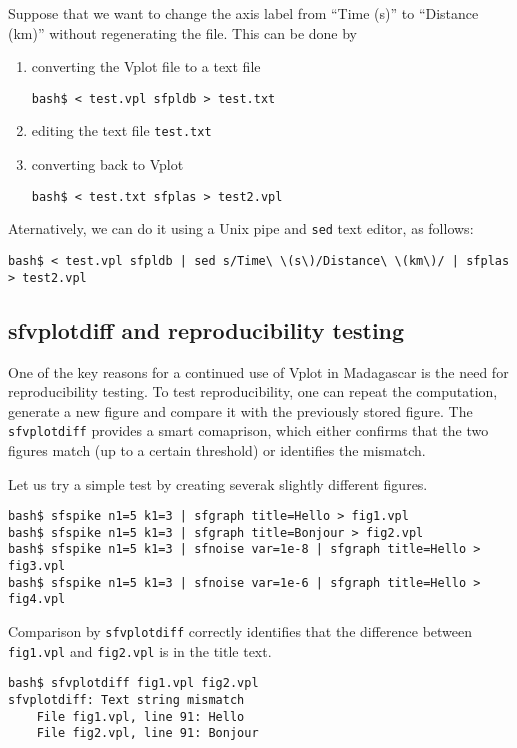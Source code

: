 Suppose that we want to change the axis label from ``Time (s)'' to ``Distance (km)'' without regenerating the file. This can be done by
\begin{enumerate}
\item converting the Vplot file to a text file
\begin{verbatim}
bash$ < test.vpl sfpldb > test.txt
\end{verbatim}
\item editing the text file \texttt{test.txt}
\item converting back to Vplot
\begin{verbatim}
bash$ < test.txt sfplas > test2.vpl
\end{verbatim}
\end{enumerate}

Aternatively, we can do it using a Unix pipe and \texttt{sed} text editor, as follows:
\begin{verbatim}
bash$ < test.vpl sfpldb | sed s/Time\ \(s\)/Distance\ \(km\)/ | sfplas > test2.vpl
\end{verbatim}

\subsection{sfvplotdiff and reproducibility testing}

One of the key reasons for a continued use of Vplot in Madagascar is
the need for reproducibility testing. To test reproducibility, one can
repeat the computation, generate a new figure and compare it with the
previously stored figure. The \texttt{sfvplotdiff} provides a smart
comaprison, which either confirms that the two figures match (up to
a certain threshold) or identifies the mismatch.

Let us try a simple test by creating severak slightly different figures.
\begin{verbatim}
bash$ sfspike n1=5 k1=3 | sfgraph title=Hello > fig1.vpl
bash$ sfspike n1=5 k1=3 | sfgraph title=Bonjour > fig2.vpl
bash$ sfspike n1=5 k1=3 | sfnoise var=1e-8 | sfgraph title=Hello > fig3.vpl
bash$ sfspike n1=5 k1=3 | sfnoise var=1e-6 | sfgraph title=Hello > fig4.vpl
\end{verbatim}

Comparison by \texttt{sfvplotdiff} correctly identifies that the
difference between \texttt{fig1.vpl} and \texttt{fig2.vpl} is in the
title text.
\begin{verbatim}
bash$ sfvplotdiff fig1.vpl fig2.vpl 
sfvplotdiff: Text string mismatch
	File fig1.vpl, line 91: Hello
	File fig2.vpl, line 91: Bonjour
\end{verbatim}

